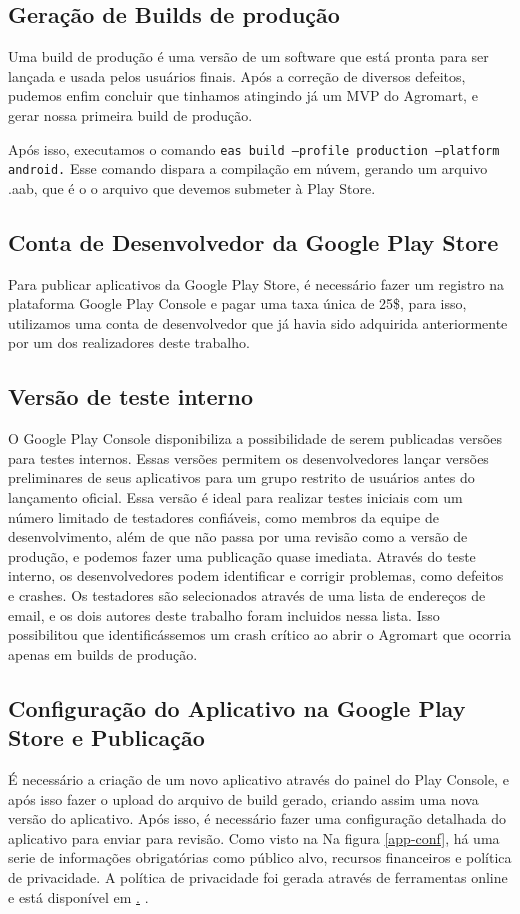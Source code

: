 \subsection{Geração de Builds de produção}

Uma build de produção é uma versão de um software que está pronta para ser lançada e usada pelos usuários finais. Após a correção de diversos defeitos, pudemos enfim concluir que tinhamos atingindo já um MVP do Agromart, e gerar nossa primeira build de produção.

Após isso, executamos o comando \texttt{eas build  ---profile production  ---platform android.} Esse comando dispara a compilação em núvem, gerando um arquivo .aab, que é o o arquivo que devemos submeter à Play Store.

\subsection{Conta de Desenvolvedor da Google Play Store}
Para publicar aplicativos da Google Play Store, é necessário fazer um registro na plataforma Google Play Console e pagar uma taxa única de 25\$, para isso, utilizamos uma conta de desenvolvedor que já havia sido adquirida anteriormente por um dos realizadores deste trabalho.

\subsection{Versão de teste interno}
O Google Play Console disponibiliza a possibilidade de serem publicadas versões para testes internos. Essas versões permitem os desenvolvedores lançar versões preliminares de seus aplicativos para um grupo restrito de usuários antes do lançamento oficial. Essa versão é ideal para realizar testes iniciais com um número limitado de testadores confiáveis, como membros da equipe de desenvolvimento, além de que não passa por uma revisão como a versão de produção, e podemos fazer uma publicação quase imediata. Através do teste interno, os desenvolvedores podem identificar e corrigir problemas, como defeitos e crashes. Os testadores são selecionados através de uma lista de endereços de email, e os dois autores deste trabalho foram incluidos nessa lista. Isso possibilitou que identificássemos um crash crítico ao abrir o Agromart que ocorria apenas em builds de produção.

\subsection{Configuração do Aplicativo na Google Play Store e Publicação}
É necessário a criação de um novo aplicativo através do painel do Play Console, e após isso fazer o upload do arquivo de build gerado, criando assim uma nova versão do aplicativo.
Após isso, é necessário fazer uma configuração detalhada do aplicativo para enviar para revisão. Como visto na Na figura \ref{app-conf}, há uma serie de informações obrigatórias como público alvo, recursos financeiros e política de privacidade. A política de privacidade foi gerada através de ferramentas online e está disponível em \href{https://www.freeprivacypolicy.com/live/b43f2c89-15ae-43e1-a55b-d3eec294da3b}.
.


